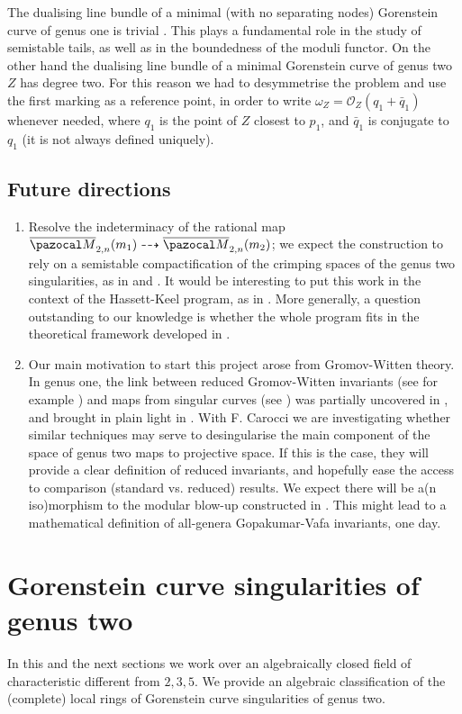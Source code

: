 \documentclass[11pt]{amsart}
\newcommand{\OO}{\mathcal O}
\newcommand{\oM}{\overline{\pazocal M}}
\theoremstyle{plain}
\theoremstyle{definition}
\begin{document}
The dualising line bundle of a minimal (with no separating nodes) Gorenstein curve of genus one is trivial \cite[Lemma 3.3]{SMY1}. This plays a fundamental role in the study of semistable tails, as well as in the boundedness of the moduli functor. On the other hand the dualising line bundle of a minimal Gorenstein curve of genus two $Z$ has degree two. For this reason we had to desymmetrise the problem and use the first marking as a reference point, in order to write $\omega_Z=\OO_Z(q_1+\bar q_1)$ whenever needed, where $q_1$ is the point of $Z$ closest to $p_1$, and $\bar q_1$ is conjugate to $q_1$ (it is not always defined uniquely).

\subsection{Future directions}
\begin{enumerate}
 \item Resolve the indeterminacy of the rational map $\oM_{2,n}(m_1)\dashrightarrow\oM_{2,n}(m_2)$; we expect the construction to rely on a semistable compactification of the crimping spaces of the genus two singularities, as in \cite[\S 1.10]{vdW} and \cite{SMY3}. It would be interesting to put this work in the context of the Hassett-Keel program, as in \cite{SMY2}. More generally, a question outstanding to our knowledge is whether the whole program fits in the theoretical framework developed in \cite{DHLinstability}.
 \item Our main motivation to start this project arose from Gromov-Witten theory. In genus one, the link between reduced Gromov-Witten invariants (see for example \cite{VZ,Zingerred,LZ}) and maps from singular curves (see \cite{VISC}) was partially uncovered in \cite{BCM}, and brought in plain light in \cite{RSPW1,RSPW2}. With F. Carocci we are investigating whether similar techniques may serve to desingularise the main component of the space of genus two maps to projective space. If this is the case, they will provide a clear definition of reduced invariants, and hopefully ease the access to comparison (standard vs. reduced) results. We expect there will be a(n iso)morphism to the modular blow-up constructed in \cite{HLN}. This might lead to a mathematical definition of all-genera Gopakumar-Vafa invariants, one day.
\end{enumerate}

\section{Gorenstein curve singularities of genus two}
In this and the next sections we work over an algebraically closed field of characteristic different from $2,3,5$. We provide an algebraic classification of the (complete) local rings of Gorenstein curve singularities of genus two.
\end{document}

